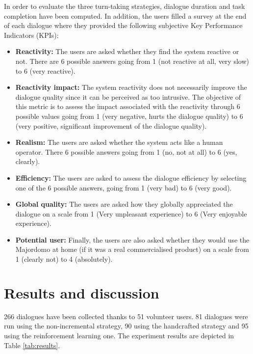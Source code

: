 		In order to evaluate the three turn-taking strategies, dialogue duration and task completion have been computed. In addition, the users filled a survey at the end of each dialogue where they provided the following subjective Key Performance Indicators (KPIs):
		
		\begin{itemize}
			\item \textbf{Reactivity:} The users are asked whether they find the system reactive or not. There are 6 possible answers going from 1 (not reactive at all, very slow) to 6 (very reactive).
			\item \textbf{Reactivity impact:} The system reactivity does not necessarily improve the dialogue quality since it can be perceived as too intrusive. The objective of this metric is to assess the impact associated with the reactivity through 6 possible values going from 1 (very negative, hurts the dialogue quality) to 6 (very positive, significant improvement of the dialogue quality).
			\item \textbf{Realism:} The users are asked whether the system acts like a human operator. There 6 possible answers going from 1 (no, not at all) to 6 (yes, clearly).
			\item \textbf{Efficiency:} The users are asked to assess the dialogue efficiency by selecting one of the 6 possible answers, going from 1 (very bad) to 6 (very good).
			\item \textbf{Global quality:} The users are asked how they globally appreciated the dialogue on a scale from 1 (Very unpleasant experience) to 6 (Very enjoyable experience).
			\item \textbf{Potential user:} Finally, the users are also asked whether they would use the Majordomo at home (if it was a real commercialised product) on a scale from 1 (clearly not) to 4 (absolutely).
		\end{itemize}


\section{Results and discussion}

	266 dialogues have been collected thanks to 51 volunteer users. 81 dialogues were run using the non-incremental strategy, 90 using the handcrafted strategy and 95 using the reinforcement learning one. The experiment results are depicted in Table \ref{tab:results}.
	
